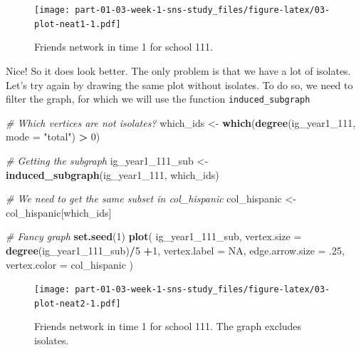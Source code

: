\documentclass[
]{book}
\newenvironment{Shaded}{\begin{snugshade}}{\end{snugshade}}
\newcommand{\AttributeTok}[1]{\textcolor[rgb]{0.13,0.29,0.53}{#1}}
\newcommand{\CommentTok}[1]{\textcolor[rgb]{0.56,0.35,0.01}{\textit{#1}}}
\newcommand{\ConstantTok}[1]{\textcolor[rgb]{0.56,0.35,0.01}{#1}}
\newcommand{\DecValTok}[1]{\textcolor[rgb]{0.00,0.00,0.81}{#1}}
\newcommand{\FunctionTok}[1]{\textcolor[rgb]{0.13,0.29,0.53}{\textbf{#1}}}
\newcommand{\NormalTok}[1]{#1}
\newcommand{\OtherTok}[1]{\textcolor[rgb]{0.56,0.35,0.01}{#1}}
\newcommand{\SpecialCharTok}[1]{\textcolor[rgb]{0.81,0.36,0.00}{\textbf{#1}}}
\newcommand{\StringTok}[1]{\textcolor[rgb]{0.31,0.60,0.02}{#1}}
\begin{document}
\begin{figure}
\centering
\texttt{[image: part-01-03-week-1-sns-study\_files/figure-latex/03-plot-neat1-1.pdf]}
\caption{\label{fig:03-plot-neat1}Friends network in time 1 for school 111.}
\end{figure}

Nice! So it does look better. The only problem is that we have a lot of isolates. Let's try again by drawing the same plot without isolates. To do so, we need to filter the graph, for which we will use the function \texttt{induced\_subgraph}

\begin{Shaded}
\begin{Highlighting}[]
\CommentTok{\# Which vertices are not isolates?}
\NormalTok{which\_ids }\OtherTok{\textless{}{-}} \FunctionTok{which}\NormalTok{(}\FunctionTok{degree}\NormalTok{(ig\_year1\_111, }\AttributeTok{mode =} \StringTok{"total"}\NormalTok{) }\SpecialCharTok{\textgreater{}} \DecValTok{0}\NormalTok{)}

\CommentTok{\# Getting the subgraph}
\NormalTok{ig\_year1\_111\_sub }\OtherTok{\textless{}{-}} \FunctionTok{induced\_subgraph}\NormalTok{(ig\_year1\_111, which\_ids)}

\CommentTok{\# We need to get the same subset in col\_hispanic}
\NormalTok{col\_hispanic }\OtherTok{\textless{}{-}}\NormalTok{ col\_hispanic[which\_ids]}
\end{Highlighting}
\end{Shaded}

\begin{Shaded}
\begin{Highlighting}[]
\CommentTok{\# Fancy graph}
\FunctionTok{set.seed}\NormalTok{(}\DecValTok{1}\NormalTok{)}
\FunctionTok{plot}\NormalTok{(}
\NormalTok{  ig\_year1\_111\_sub,}
  \AttributeTok{vertex.size     =} \FunctionTok{degree}\NormalTok{(ig\_year1\_111\_sub)}\SpecialCharTok{/}\DecValTok{5} \SpecialCharTok{+}\DecValTok{1}\NormalTok{,}
  \AttributeTok{vertex.label    =} \ConstantTok{NA}\NormalTok{,}
  \AttributeTok{edge.arrow.size =}\NormalTok{ .}\DecValTok{25}\NormalTok{,}
  \AttributeTok{vertex.color    =}\NormalTok{ col\_hispanic}
\NormalTok{  )}
\end{Highlighting}
\end{Shaded}

\begin{figure}
\centering
\texttt{[image: part-01-03-week-1-sns-study\_files/figure-latex/03-plot-neat2-1.pdf]}
\caption{\label{fig:03-plot-neat2}Friends network in time 1 for school 111. The graph excludes isolates.}
\end{figure}
\end{document}

